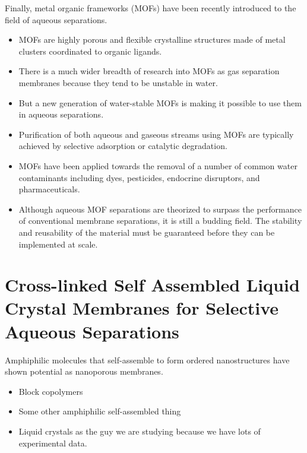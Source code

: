   Finally, metal organic frameworks (MOFs) have been recently introduced to the
  field of aqueous separations.
  \begin{itemize}
    \item MOFs are highly porous and flexible crystalline structures made of metal
    clusters coordinated to organic ligands.~\cite{furukawa_chemistry_2013}
    \item There is a much wider breadth of research into MOFs as gas separation membranes
    because they tend to be unstable in water.~\cite{feng_construction_2013}
    \item But a new generation of water-stable MOFs is making it possible to use them
    in aqueous separations.~\cite{wang_ultrastable_2015}
    \item Purification of both aqueous and gaseous streams using MOFs are 
    typically achieved by selective adsorption or catalytic degradation.~\cite{li_metalorganic_2012}    
    \item MOFs have been applied towards the removal of a number of common water 
    contaminants including dyes, pesticides, endocrine disruptors, and pharmaceuticals.
    \cite{zhang_fabrication_2015,seo_adsorptive_2015,li_metalorganic_2015,hasan_adsorptive_2012}
    \item Although aqueous MOF separations are theorized to surpass the performance 
    of conventional membrane separations, it is still a budding field. The stability and
    reusability of the material must be guaranteed before they can be implemented
    at scale.~\cite{dias_towards_2015}
  \end{itemize}
  
  \section{Cross-linked Self Assembled Liquid Crystal Membranes for Selective Aqueous Separations}
  
  Amphiphilic molecules that self-assemble to form ordered nanostructures have shown
  potential as nanoporous membranes.
  \begin{itemize}
    \item Block copolymers
    \item Some other amphiphilic self-assembled thing
    \item Liquid crystals as the guy we are studying because we have lots of 
    experimental data.
  \end{itemize}
    
